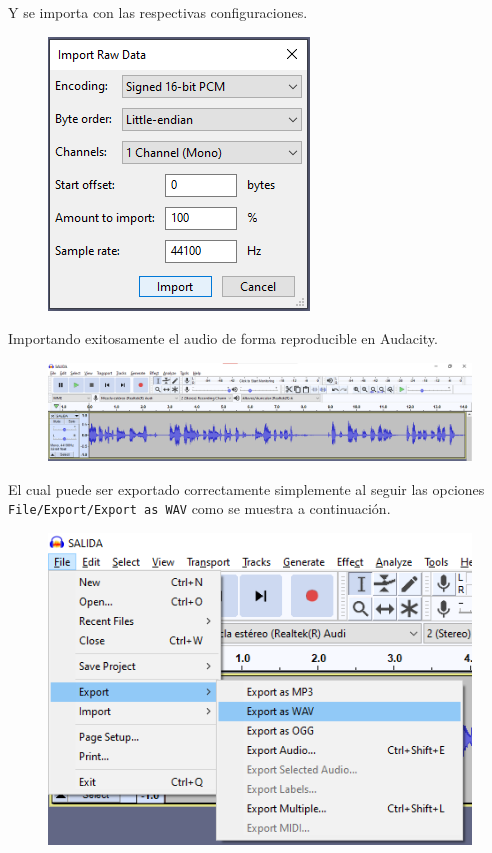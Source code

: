\documentclass[conference,onecolumn]{IEEEtran}
\begin{document}
Y se importa con las respectivas configuraciones.

 \begin{figure}[H]
 \centering
    \includegraphics[scale=0.6]{VM9.png}
\end{figure}

Importando exitosamente el audio de forma reproducible en Audacity.

 \begin{figure}[H]
 \centering
    \includegraphics[scale=0.4]{VM10.png}
\end{figure}

El cual puede ser exportado correctamente simplemente al seguir las opciones \texttt{File/Export/Export as WAV} como se muestra a continuación.

 \begin{figure}[H]
 \centering
    \includegraphics[scale=0.4]{VM11.png}
\end{figure}
\end{document}
